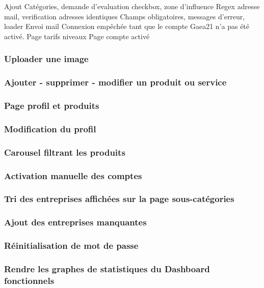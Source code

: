 Ajout Catégories, demande d'evaluation checkbox, zone d'influence
Regex adresse mail, verification adresses identiques
Champs obligatoires,
messages d'erreur,
loader
Envoi mail
Connexion empêchée tant que le compte Gaea21 n'a pas été activé.
Page tarifs niveaux
Page compte activé

\subsubsection{Uploader une image}

\subsubsection{Ajouter - supprimer - modifier un produit ou service}

\subsubsection{Page profil et produits}

\subsubsection{Modification du profil}

\subsubsection{Carousel filtrant les produits}

\subsubsection{Activation manuelle des comptes}

\subsubsection{Tri des entreprises affichées sur la page sous-catégories}

\subsubsection{Ajout des entreprises manquantes}

\subsubsection{Réinitialisation de mot de passe}

\subsubsection{Rendre les graphes de statistiques du Dashboard fonctionnels}

